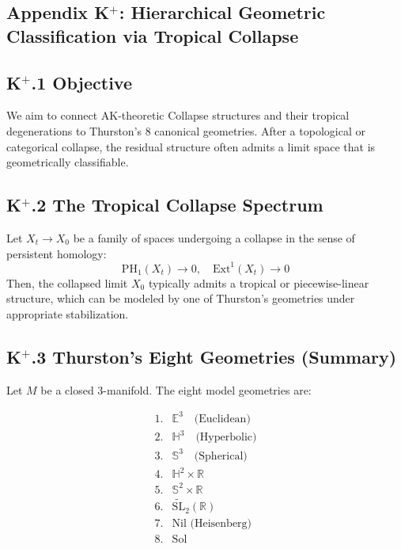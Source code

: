 \documentclass[11pt]{article}
\begin{document}
\begin{axiom}
\begin{axiom}
\section*{Appendix K$^+$: Hierarchical Geometric Classification via Tropical Collapse}

\subsection*{K$^+$.1 Objective}

We aim to connect AK-theoretic Collapse structures and their tropical degenerations  
to Thurston's 8 canonical geometries. After a topological or categorical collapse, the residual structure  
often admits a limit space that is geometrically classifiable.

\subsection*{K$^+$.2 The Tropical Collapse Spectrum}

Let \( X_t \to X_0 \) be a family of spaces undergoing a collapse in the sense of persistent homology:
\[
\mathrm{PH}_1(X_t) \to 0, \quad \mathrm{Ext}^1(X_t) \to 0
\]
Then, the collapsed limit \( X_0 \) typically admits a tropical or piecewise-linear structure,  
which can be modeled by one of Thurston's geometries under appropriate stabilization.

\subsection*{K$^+$.3 Thurston's Eight Geometries (Summary)}

Let \( M \) be a closed 3-manifold. The eight model geometries are:

\[
\begin{array}{ll}
1. & \mathbb{E}^3 \quad \text{(Euclidean)} \\
2. & \mathbb{H}^3 \quad \text{(Hyperbolic)} \\
3. & \mathbb{S}^3 \quad \text{(Spherical)} \\
4. & \mathbb{H}^2 \times \mathbb{R} \\
5. & \mathbb{S}^2 \times \mathbb{R} \\
6. & \widetilde{\mathrm{SL}}_2(\mathbb{R}) \\
7. & \text{Nil (Heisenberg)} \\
8. & \text{Sol}
\end{array}
\]


\end{axiom}
\end{axiom}
\end{document}

